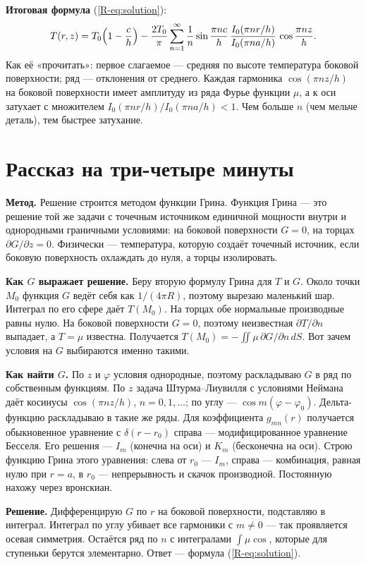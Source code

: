 \documentclass[a4paper,12pt]{article}
\newcommand{\rf}[1]{(\ref*{R-#1})}
\begin{document}
\textbf{Итоговая формула} \rf{eq:solution}:
\[
T(r,z)=T_0\Bigl(1-\frac ch\Bigr)-\frac{2T_0}{\pi}\sum_{n=1}^\infty
\frac1n\sin\frac{\pi nc}{h}\,\frac{I_0(\pi nr/h)}{I_0(\pi na/h)}\,
\cos\frac{\pi nz}{h}.
\]
Как её «прочитать»: первое слагаемое — средняя по высоте температура
боковой поверхности; ряд — отклонения от среднего. Каждая гармоника
$\cos(\pi nz/h)$ на боковой поверхности имеет амплитуду из ряда Фурье
функции $\mu$, а к оси затухает с множителем $I_0(\pi nr/h)/I_0(\pi na/h)<1$.
Чем больше $n$ (чем мельче деталь), тем быстрее затухание.

\section{Рассказ на три-четыре минуты}
\label{sec:story}

\textbf{Метод.} Решение строится методом функции Грина. Функция Грина —
это решение той же задачи с точечным источником единичной мощности внутри
и однородными граничными условиями: на боковой поверхности $G=0$, на
торцах $\partial G/\partial z=0$. Физически — температура, которую создаёт
точечный источник, если боковую поверхность охлаждать до нуля, а торцы
изолировать.

\textbf{Как $G$ выражает решение.} Беру вторую формулу Грина для $T$ и
$G$. Около точки $M_0$ функция $G$ ведёт себя как $1/(4\pi R)$, поэтому
вырезаю маленький шар. Интеграл по его сфере даёт $T(M_0)$. На торцах обе
нормальные производные равны нулю. На боковой поверхности $G=0$, поэтому
неизвестная $\partial T/\partial n$ выпадает, а $T=\mu$ известна.
Получается $T(M_0)=-\iint\mu\,\partial G/\partial n\,dS$. Вот зачем
условия на $G$ выбираются именно такими.

\textbf{Как найти $G$.} По $z$ и $\varphi$ условия однородные, поэтому
раскладываю $G$ в ряд по собственным функциям. По $z$ задача
Штурма–Лиувилля с условиями Неймана даёт косинусы $\cos(\pi nz/h)$,
$n=0,1,\dots$; по углу — $\cos m(\varphi-\varphi_0)$. Дельта-функцию
раскладываю в такие же ряды. Для коэффициента $g_{mn}(r)$ получается
обыкновенное уравнение с $\delta(r-r_0)$ справа — модифицированное
уравнение Бесселя. Его решения — $I_m$ (конечна на оси) и $K_m$ (бесконечна
на оси). Строю функцию Грина этого уравнения: слева от $r_0$ — $I_m$,
справа — комбинация, равная нулю при $r=a$, в $r_0$ — непрерывность и
скачок производной. Постоянную нахожу через вронскиан.

\textbf{Решение.} Дифференцирую $G$ по $r$ на боковой поверхности,
подставляю в интеграл. Интеграл по углу убивает все гармоники с $m\ne0$ —
так проявляется осевая симметрия. Остаётся ряд по $n$ с интегралами
$\int\mu\cos$, которые для ступеньки берутся элементарно. Ответ —
формула \rf{eq:solution}.
\end{document}
